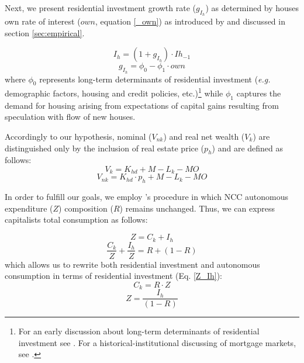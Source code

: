 \documentclass[11pt]{article}
\begin{document}
Next, we present residential investment growth rate (\(g_{I_h}\)) as determined by houses own rate of interest (\(own\), equation \ref{_own}) as introduced by \textcite{teixeira_crescimento_2015} and discussed in section \ref{sec:empirical}.


\begin{equation}
    I_h = (1 + g_{I_h})\cdot Ih_{-1}
\end{equation}
\begin{equation}
\label{g_Z_own}
g_{I_h} = \phi_0 - \phi_1\cdot own
\end{equation}
where  \(\phi_0\) represents long-term determinants of residential investment (\emph{e.g.} demographic factors, housing and credit policies, etc.)\footnote{For an early discussion about long-term determinants of residential investment see \textcite{grebler_capital_1956}. For a historical-institutional discussing of mortgage markets, see \textcite{green_american_2005}.} while \(\phi_1\) captures the demand for housing arising from expectations of capital gains resulting from speculation with flow of new houses. 

Accordingly to our hypothesis, nominal (\(V_{nk}\)) and real net wealth (\(V_{k}\)) are distinguished only by the inclusion of real estate price (\(p_h\)) and are defined as follows:
\begin{equation}
V_{k} = K_{hd} + M - L_{k} - MO
\end{equation}
\begin{equation}
V_{nk} = K_{hd}\cdot p_h + M - L_{k} - MO
\end{equation}


In order to fulfill our goals, we employ \citeauthor*{freitas_baseline_2020}'s \citeyear{freitas_baseline_2020} procedure in which NCC autonomous expenditure (\(Z\)) composition (\(R\)) remains unchanged. Thus, we can express capitalists total consumption as follows:

\begin{equation}
\label{_Z}
Z = C_k + I_h
\end{equation}
$$
\frac{C_k}{Z} + \frac{I_h}{Z} = R + (1-R)
$$
which allows us to rewrite both residential investment and autonomous consumption in terms of residential investment (Eq. \ref{Z_Ih}):
\begin{equation}
\label{_Ck}
    C_k = R\cdot Z
\end{equation}
\begin{equation}
\label{Z_Ih}
Z = \frac{I_h}{(1-R)}
\end{equation}
\end{document}
